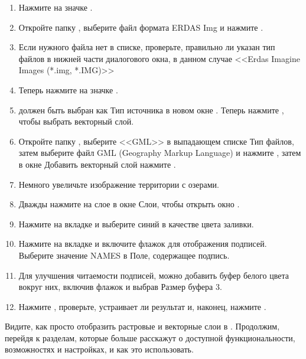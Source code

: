 {\setlength{\baselineskip}{1.3\baselineskip}
\begin{enumerate}[itemsep=2pt]
\item Нажмите на значке .
\item Откройте папку , выберите файл
формата ERDAS Img  и нажмите .
\item Если нужного файла нет в списке, проверьте, правильно ли указан
тип файлов в нижней части диалогового окна, в данном случае
<<Erdas Imagine Images (*.img, *.IMG)>>
\item Теперь нажмите на значке .
\item {} должен быть выбран как Тип источника в
новом окне . Теперь нажмите ,
чтобы выбрать векторный слой.
\item Откройте папку , выберите <<GML>>
в выпадающем списке Тип файлов, затем выберите файл GML (Geography Markup
Language)  и нажмите , затем в окне
Добавить векторный слой нажмите .
\item Немного увеличьте изображение территории с озерами.
\item Дважды нажмите на слое  в окне Слои, чтобы открыть
окно .
\item Нажмите на вкладке  и выберите синий в качестве
цвета заливки.
\item Нажмите на вкладке  и включите флажок
 для отображения подписей. Выберите значение
NAMES в Поле, содержащее подпись.
\item Для улучшения читаемости подписей, можно добавить буфер белого
цвета вокруг них, включив флажок  и
выбрав Размер буфера 3.
\item Нажмите , проверьте, устраивает ли результат и,
наконец, нажмите .
\end{enumerate}
\par}
Видите, как просто отобразить растровые и векторные слои в \qg. Продолжим,
перейдя к разделам, которые больше расскажут о доступной функциональности,
возможностях и настройках, и как это использовать.

\FloatBarrier
